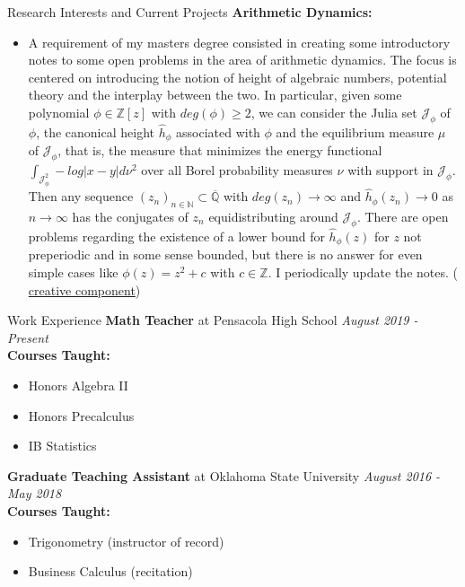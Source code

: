 \documentclass{resume} %
\newcommand{\N}{\mathbb{N}}
\newcommand{\Z}{\mathbb{Z}}
\newcommand{\Q}{\mathbb{Q}}
\newcommand{\MJ}{\mathcal{J}}
\begin{document}
\begin{rSection}{Research Interests and Current Projects}
{\bf Arithmetic Dynamics:}  
\begin{itemize}
\item A requirement of my masters degree consisted in creating some introductory notes to some open problems in the area of arithmetic dynamics. The focus is centered on introducing the notion of height of algebraic numbers,  potential theory and the interplay between the two. In particular, given some polynomial $\phi \in \Z[z]$ with $deg(\phi) \geq 2$, we can consider the Julia set $\MJ_{\phi}$ of $\phi$, the canonical height $\hat{h}_\phi$ associated with $\phi$ and the equilibrium measure $\mu$ of $\MJ_{\phi}$, that is, the measure that minimizes the energy functional $\int_{\MJ_{\phi}^2}-log|x-y|d\nu^2$ over all Borel probability measures $\nu$ with support in $\MJ_{\phi}$. Then any sequence $(z_n)_{n \in \N} \subset \overline{\Q}$ with $deg(z_n) \rightarrow \infty$ and $\hat{h}_{\phi}(z_n) \rightarrow 0$ as $n \rightarrow \infty$ has the conjugates of $z_n$ equidistributing around $\MJ_\phi$. There are open problems regarding the existence of a lower bound for $\hat{h}_{\phi}(z)$ for $z$ not preperiodic and in some sense bounded, but there is no answer for even simple cases like $\phi(z) = z^2+c$ with $c \in \Z$. I periodically update the notes. (\href{https://github.com/carsonaj/Math/blob/master/Arithmetic%20Dynamics/Arithmetic%20Dynamics%20Notes.pdf}{{\color{blue} creative component}})
\end{itemize}

\newpage
\end{rSection}

\begin{rSection}{Work Experience}
{\bf Math Teacher} at Pensacola High School \hfill {\em August 2019 - Present}\\
{\bf Courses Taught:} 
\begin{itemize}
\item Honors Algebra II
\item Honors Precalculus 
\item IB Statistics
\end{itemize} 

{\bf Graduate Teaching Assistant} at Oklahoma State University \hfill {\em August 2016 - May 2018} \\
{\bf Courses Taught:} 
\begin{itemize}
\item Trigonometry (instructor of record)
\item Business Calculus (recitation)
\end{itemize} 

\end{rSection}
\end{document}
